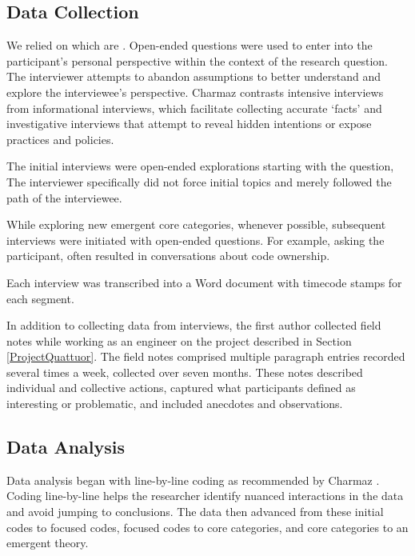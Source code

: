 \subsection{Data Collection}
We relied on  which are  \cite{Charmaz}. Open-ended questions were used to enter into the participant's personal perspective within the context of the research question. The interviewer attempts to abandon assumptions to better understand and explore the interviewee's perspective. Charmaz \cite{Charmaz} contrasts intensive interviews from informational interviews, which facilitate collecting accurate `facts' and investigative interviews that attempt to reveal hidden intentions or expose practices and policies. 
 
The initial interviews were open-ended explorations starting with the question,  The interviewer specifically did not force initial topics and merely followed the path of the interviewee. 

While exploring new emergent core categories, whenever possible, subsequent interviews were initiated with open-ended questions.  For example, asking the participant,  often resulted in conversations about code ownership. 

Each interview was transcribed into a Word document with timecode stamps for each segment.

In addition to collecting data from interviews, the first author collected field notes while working as an engineer on the project described in Section \ref{ProjectQuattuor}. The field notes comprised multiple paragraph entries recorded several times a week, collected over seven months. These notes described individual and collective actions, captured what participants defined as interesting or problematic, and included anecdotes and observations. 
\subsection{Data Analysis}
Data analysis began with line-by-line coding as recommended by Charmaz \cite{Charmaz}. Coding line-by-line helps the researcher identify nuanced interactions in the data and avoid jumping to conclusions. The data then advanced from these initial codes to focused codes, focused codes to core categories, and core categories to an emergent theory. 

